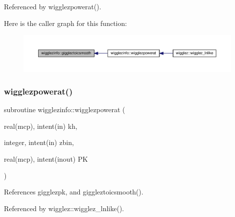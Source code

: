 Referenced by wigglezpowerat().

Here is the caller graph for this function\+:
\nopagebreak
\begin{figure}[H]
\begin{center}
\leavevmode
\includegraphics[width=350pt]{namespacewigglezinfo_aa01d4906da1313fa5a21d8f3b5029f50_icgraph}
\end{center}
\end{figure}
\mbox{\label{namespacewigglezinfo_acb08f5ab3e49247de82dbfb12666f12e}} 
\subsubsection{\texorpdfstring{wigglezpowerat()}{wigglezpowerat()}}
{\footnotesize\ttfamily subroutine wigglezinfo\+::wigglezpowerat (\begin{DoxyParamCaption}\item[{real(mcp), intent(in)}]{kh,  }\item[{integer, intent(in)}]{zbin,  }\item[{real(mcp), intent(inout)}]{PK }\end{DoxyParamCaption})}



References gigglezpk, and giggleztoicsmooth().



Referenced by wigglez\+::wigglez\+\_\+lnlike().

